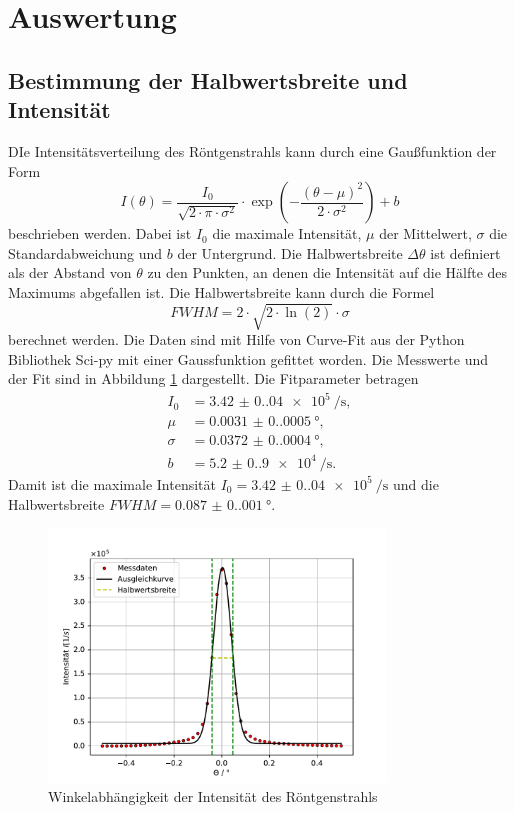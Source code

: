 \section{Auswertung}
\label{sec:Auswertung}
\subsection{Bestimmung der Halbwertsbreite und Intensität}
DIe Intensitätsverteilung des Röntgenstrahls kann durch eine Gaußfunktion der Form
\begin{equation}
    I(\theta)=\frac{I_0}{\sqrt{2\cdot \pi \cdot \sigma^2}} \cdot \exp\left(-\frac{(\theta-\mu)^2}{2\cdot \sigma^2}\right)+b
\end{equation}
beschrieben werden. Dabei ist $I_0$ die maximale Intensität, $\mu$ der Mittelwert, $\sigma$ die Standardabweichung und $b$ der Untergrund. Die Halbwertsbreite $\Delta \theta$ ist definiert als der Abstand von $\theta$ zu den Punkten, an denen die Intensität auf die Hälfte des Maximums abgefallen ist. Die Halbwertsbreite kann durch die Formel
\begin{equation}
    FWHM = 2\cdot \sqrt{2\cdot \ln(2)}\cdot \sigma
\end{equation}
berechnet werden. Die Daten sind mit Hilfe von Curve-Fit aus der Python Bibliothek Sci-py mit einer Gaussfunktion gefittet worden.
Die Messwerte und der Fit sind in Abbildung \ref{fig:Detectorscan} dargestellt. Die Fitparameter betragen
\begin{align*}
    I_0 &= \SI{3.42(0.04)e5}{\per\second}, \\
    \mu &= \SI{0.0031(0.0005)}{\degree}, \\
    \sigma &= \SI{0.0372(0.0004)}{\degree}, \\
    b &= \SI{5.2(0.9)e4}{\per\second}.
\end{align*}
Damit ist die maximale Intensität $I_0=\SI{3.42(0.04)e5}{\per\second}$ und die Halbwertsbreite $FWHM = \SI{0.087(0.001)}{\degree}$.
\begin{figure}[H]
    \centering
    \includegraphics[width=0.8\textwidth]{plots/Detectorscan.pdf}
    \caption{Winkelabhängigkeit der Intensität des Röntgenstrahls}
    \label{fig:Detectorscan}
\end{figure}
